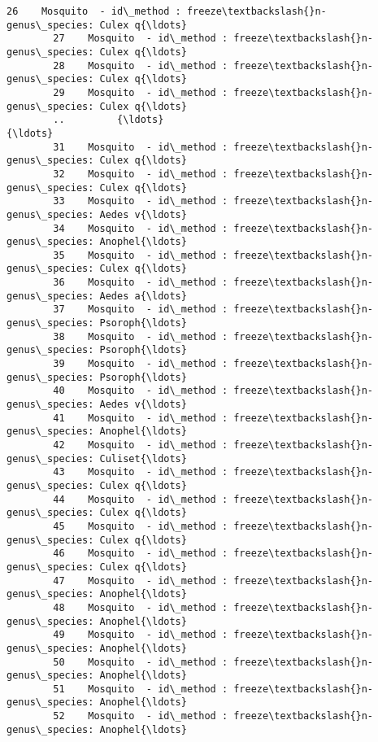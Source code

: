 \documentclass[11pt]{article}
\begin{document}
\begin{Verbatim}[commandchars=\\\{\}]
        26    Mosquito  - id\_method : freeze\textbackslash{}n- genus\_species: Culex q{\ldots}   
        27    Mosquito  - id\_method : freeze\textbackslash{}n- genus\_species: Culex q{\ldots}   
        28    Mosquito  - id\_method : freeze\textbackslash{}n- genus\_species: Culex q{\ldots}   
        29    Mosquito  - id\_method : freeze\textbackslash{}n- genus\_species: Culex q{\ldots}   
        ..         {\ldots}                                                {\ldots}   
        31    Mosquito  - id\_method : freeze\textbackslash{}n- genus\_species: Culex q{\ldots}   
        32    Mosquito  - id\_method : freeze\textbackslash{}n- genus\_species: Culex q{\ldots}   
        33    Mosquito  - id\_method : freeze\textbackslash{}n- genus\_species: Aedes v{\ldots}   
        34    Mosquito  - id\_method : freeze\textbackslash{}n- genus\_species: Anophel{\ldots}   
        35    Mosquito  - id\_method : freeze\textbackslash{}n- genus\_species: Culex q{\ldots}   
        36    Mosquito  - id\_method : freeze\textbackslash{}n- genus\_species: Aedes a{\ldots}   
        37    Mosquito  - id\_method : freeze\textbackslash{}n- genus\_species: Psoroph{\ldots}   
        38    Mosquito  - id\_method : freeze\textbackslash{}n- genus\_species: Psoroph{\ldots}   
        39    Mosquito  - id\_method : freeze\textbackslash{}n- genus\_species: Psoroph{\ldots}   
        40    Mosquito  - id\_method : freeze\textbackslash{}n- genus\_species: Aedes v{\ldots}   
        41    Mosquito  - id\_method : freeze\textbackslash{}n- genus\_species: Anophel{\ldots}   
        42    Mosquito  - id\_method : freeze\textbackslash{}n- genus\_species: Culiset{\ldots}   
        43    Mosquito  - id\_method : freeze\textbackslash{}n- genus\_species: Culex q{\ldots}   
        44    Mosquito  - id\_method : freeze\textbackslash{}n- genus\_species: Culex q{\ldots}   
        45    Mosquito  - id\_method : freeze\textbackslash{}n- genus\_species: Culex q{\ldots}   
        46    Mosquito  - id\_method : freeze\textbackslash{}n- genus\_species: Culex q{\ldots}   
        47    Mosquito  - id\_method : freeze\textbackslash{}n- genus\_species: Anophel{\ldots}   
        48    Mosquito  - id\_method : freeze\textbackslash{}n- genus\_species: Anophel{\ldots}   
        49    Mosquito  - id\_method : freeze\textbackslash{}n- genus\_species: Anophel{\ldots}   
        50    Mosquito  - id\_method : freeze\textbackslash{}n- genus\_species: Anophel{\ldots}   
        51    Mosquito  - id\_method : freeze\textbackslash{}n- genus\_species: Anophel{\ldots}   
        52    Mosquito  - id\_method : freeze\textbackslash{}n- genus\_species: Anophel{\ldots}   

\end{Verbatim}
\end{document}
